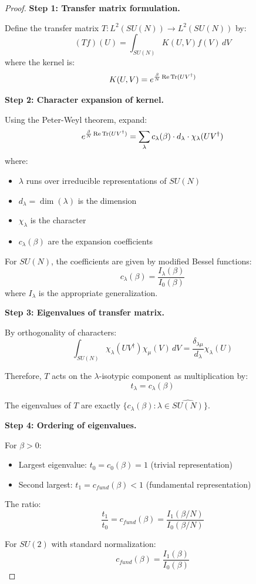 \begin{proof}
\textbf{Step 1: Transfer matrix formulation.}

Define the transfer matrix $T: L^2(SU(N)) \to L^2(SU(N))$ by:
\[
(Tf)(U) = \int_{SU(N)} K(U, V) f(V) \, dV
\]
where the kernel is:
\[
K(U, V) = e^{\frac{\beta}{N}\operatorname{Re}\operatorname{Tr}(UV^\dagger)}
\]

\textbf{Step 2: Character expansion of kernel.}

Using the Peter-Weyl theorem, expand:
\[
e^{\frac{\beta}{N}\operatorname{Re}\operatorname{Tr}(UV^\dagger)} = \sum_{\lambda} c_\lambda(\beta) \cdot d_\lambda \cdot \chi_\lambda(UV^\dagger)
\]
where:
\begin{itemize}
\item $\lambda$ runs over irreducible representations of $SU(N)$
\item $d_\lambda = \dim(\lambda)$ is the dimension
\item $\chi_\lambda$ is the character
\item $c_\lambda(\beta)$ are the expansion coefficients
\end{itemize}

For $SU(N)$, the coefficients are given by modified Bessel functions:
\[
c_\lambda(\beta) = \frac{I_\lambda(\beta)}{I_0(\beta)}
\]
where $I_\lambda$ is the appropriate generalization.

\textbf{Step 3: Eigenvalues of transfer matrix.}

By orthogonality of characters:
\[
\int_{SU(N)} \chi_\lambda(UV^\dagger) \chi_\mu(V) \, dV = \frac{\delta_{\lambda\mu}}{d_\lambda} \chi_\lambda(U)
\]

Therefore, $T$ acts on the $\lambda$-isotypic component as multiplication by:
\[
t_\lambda = c_\lambda(\beta)
\]

The eigenvalues of $T$ are exactly $\{c_\lambda(\beta) : \lambda \in \widehat{SU(N)}\}$.

\textbf{Step 4: Ordering of eigenvalues.}

For $\beta > 0$:
\begin{itemize}
\item Largest eigenvalue: $t_0 = c_0(\beta) = 1$ (trivial representation)
\item Second largest: $t_1 = c_{fund}(\beta) < 1$ (fundamental representation)
\end{itemize}

The ratio:
\[
\frac{t_1}{t_0} = c_{fund}(\beta) = \frac{I_1(\beta/N)}{I_0(\beta/N)}
\]

For $SU(2)$ with standard normalization:
\[
c_{fund}(\beta) = \frac{I_1(\beta)}{I_0(\beta)}
\]


\end{proof}
